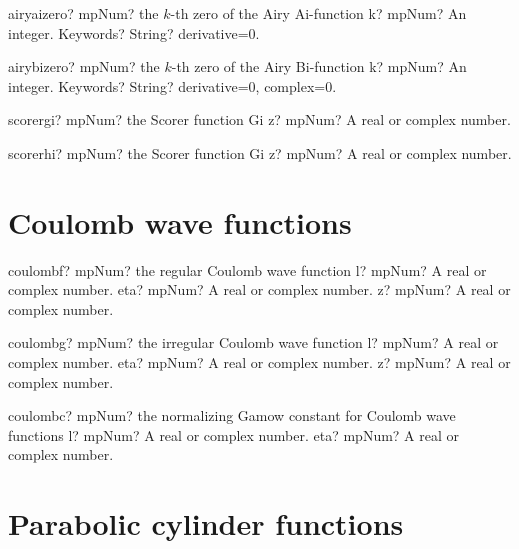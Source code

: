 \documentclass[12pt,a4paper,openany]{book}
\begin{document}
\begin{mpFunctionsExtract}
\mpFunctionTwo
{airyaizero? mpNum? the $k$-th zero of the Airy Ai-function}
{k? mpNum? An integer.}
{Keywords? String? derivative=0.}
\end{mpFunctionsExtract}

\begin{mpFunctionsExtract}
\mpFunctionTwo
{airybizero? mpNum? the $k$-th zero of the Airy Bi-function}
{k? mpNum? An integer.}
{Keywords? String? derivative=0, complex=0.}
\end{mpFunctionsExtract}

\begin{mpFunctionsExtract}
\mpFunctionOne
{scorergi? mpNum? the Scorer function Gi}
{z? mpNum? A real or complex number.}
\end{mpFunctionsExtract}

\begin{mpFunctionsExtract}
\mpFunctionOne
{scorerhi? mpNum? the Scorer function Gi}
{z? mpNum? A real or complex number.}
\end{mpFunctionsExtract}

\section{Coulomb wave functions}

\begin{mpFunctionsExtract}
\mpFunctionThree
{coulombf? mpNum? the regular Coulomb wave function}
{l? mpNum? A real or complex number.}
{eta? mpNum? A real or complex number.}
{z? mpNum? A real or complex number.}
\end{mpFunctionsExtract}

\begin{mpFunctionsExtract}
\mpFunctionThree
{coulombg? mpNum? the irregular Coulomb wave function}
{l? mpNum? A real or complex number.}
{eta? mpNum? A real or complex number.}
{z? mpNum? A real or complex number.}
\end{mpFunctionsExtract}

\begin{mpFunctionsExtract}
\mpFunctionTwo
{coulombc? mpNum? the normalizing Gamow constant for Coulomb wave functions}
{l? mpNum? A real or complex number.}
{eta? mpNum? A real or complex number.}
\end{mpFunctionsExtract}

\section{Parabolic cylinder functions}
\end{document}
